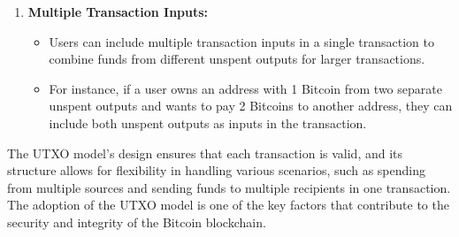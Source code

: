 \begin{enumerate}
\begin{itemize}
    \end{itemize}
    \item \textbf{Multiple Transaction Inputs:}
    \begin{itemize}
        \item Users can include multiple transaction inputs in a single transaction to combine funds from different unspent outputs for larger transactions.
        \item For instance, if a user owns an address with 1 Bitcoin from two separate unspent outputs and wants to pay 2 Bitcoins to another address, they can include both unspent outputs as inputs in the transaction.
    \end{itemize}
\end{enumerate}
The UTXO model's design ensures that each transaction is valid, and its structure allows for flexibility in handling various scenarios, such as spending from multiple sources and sending funds to multiple recipients in one transaction. The adoption of the UTXO model is one of the key factors that contribute to the security and integrity of the Bitcoin blockchain.
